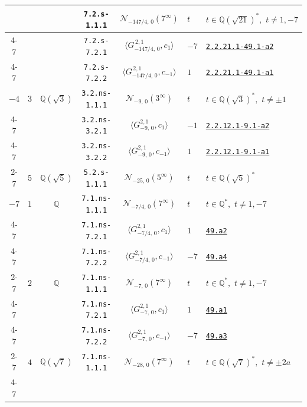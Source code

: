 \documentclass[11pt]{amsart}
\newcommand{\eclabel}[1]{\href{https://www.lmfdb.org/EllipticCurve/Q/#1}{\texttt{#1}}}
\newcommand{\ecnflabel}[2]{\href{https://www.lmfdb.org/EllipticCurve/#1-#2}{\texttt{#1-#2}}}
\theoremstyle{definition}
\newcommand{\Q}{\mathbb Q}
\newcommand{\QQ}{\mathbb Q}
\begin{document}
{\begin{longtable}{|c|c|c|c|c|l|l|}
& &  & \texttt{7.2.s-1.1.1} & $\mathcal{N}_{-147/4,\,0}(7^{\infty})$ &   $t$ &  $t\in \Q(\sqrt{21})^*,\,\,t\ne 1,-7 $ \\ \cline{4-7} 
&  & & \texttt{7.2.s-7.2.1} & $\langle G^{\,2,1}_{-147/4,\,0},c_{1}\rangle$ &   $-7$ & \ecnflabel{2.2.21.1}{49.1-a2}  \\ \cline{4-7} 
& &  & \texttt{7.2.s-7.2.2} & $\langle G^{\, 2,1}_{-147/4,\,0},c_{-1}\rangle$ &   $1$ & \ecnflabel{2.2.21.1}{49.1-a1} \\ \hline
{$-4$} & {$3$} &  {$\Q(\sqrt{3})$} 
 & \texttt{3.2.ns-1.1.1} & $\mathcal{N}_{-9,\,0}(3^{\infty})$ &   $t$ &  $t\in \Q(\sqrt{3})^*,\,\,t\ne \pm 1 $ \\ \cline{4-7} 
& &  & \texttt{3.2.ns-3.2.1} & $\langle G^{2,1}_{-9,\,0},c_{1}\rangle$ &   $-1$ &  \ecnflabel{2.2.12.1}{9.1-a2}  \\ \cline{4-7} 
& &  & \texttt{3.2.ns-3.2.2} & $\langle G^{2,1}_{-9,\,0},c_{-1}\rangle$ &   $1$ & \ecnflabel{2.2.12.1}{9.1-a1}  \\ \cline{2-7}
 & $5$ &  $\Q(\sqrt{5})$ &\texttt{5.2.s-1.1.1} & $\mathcal{N}_{-25,\,0}(5^{\infty})$ &   $t$ &  $t\in \Q(\sqrt{5})^*$ \\ \hline
{$-7$}  & {$1$}  & {$\QQ$}  
& \texttt{7.1.ns-1.1.1} & $\mathcal{N}_{-7/4,\,0}(7^{\infty})$  &   $t$ &  $t\in \Q^*,\,\,t\ne 1,-7 $ \\ \cline{4-7} 
 & &  & \texttt{7.1.ns-7.2.1} & $\langle G^{2,1}_{-7/4,\,0},c_{1}\rangle$ &   $1$ & \eclabel{49.a2}  \\ \cline{4-7} 
 & &  & \texttt{7.1.ns-7.2.2} & $\langle G^{2,1}_{-7/4,\,0},c_{-1}\rangle$ &   $-7$ & \eclabel{49.a4} \\ \cline{2-7}
& {$2$}  & {$\QQ$}  
& \texttt{7.1.ns-1.1.1} & $\mathcal{N}_{-7,\,0}(7^{\infty})$ &   $t$ &  $t\in \Q^*,\,\,t\ne 1,-7 $ \\ \cline{4-7} 
 & &  & \texttt{7.1.ns-7.2.1} & $\langle G^{2,1}_{-7,\,0},c_{1}\rangle$ &   $1$ & \eclabel{49.a1}  \\ \cline{4-7} 
 & &  & \texttt{7.1.ns-7.2.2} & $\langle G^{2,1}_{-7,\,0},c_{-1}\rangle$ &   $-7$ & \eclabel{49.a3} \\ \cline{2-7}
 &  {$4$} &  {$\Q(\sqrt{7})$} 
 & \texttt{7.1.ns-1.1.1} & $\mathcal{N}_{-28,\,0}(7^{\infty})$ &   $t$ &  $t\in \Q(\sqrt{7})^*,\,\,t\ne \pm 2a $ \\ \cline{4-7} 

\end{longtable}}
\end{document}
